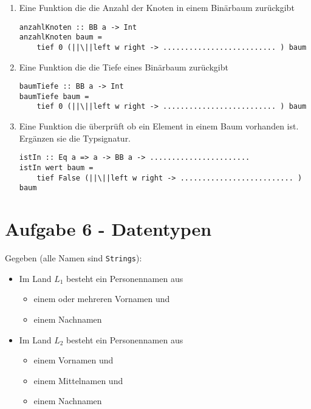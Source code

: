 \documentclass{article}
\begin{document}
\begin{enumerate} [label={\alph*)}]
    \item Eine Funktion die die Anzahl der Knoten in einem Binärbaum zurückgibt
\begin{verbatim}
anzahlKnoten :: BB a -> Int
anzahlKnoten baum =
    tief 0 (||\||left w right -> .......................... ) baum
\end{verbatim}

    \item Eine Funktion die die Tiefe eines Binärbaum zurückgibt
        \begin{verbatim}
baumTiefe :: BB a -> Int
baumTiefe baum =
    tief 0 (||\||left w right -> .......................... ) baum
        \end{verbatim}

    \item Eine Funktion die überprüft ob ein Element in einem Baum vorhanden ist. Ergänzen sie die Typsignatur.
\begin{verbatim}
istIn :: Eq a => a -> BB a -> .......................
istIn wert baum =
    tief False (||\||left w right -> .......................... ) baum
\end{verbatim}

\end{enumerate}

\section*{Aufgabe 6 - Datentypen}
Gegeben (alle Namen sind \texttt{Strings}):
\begin{itemize}
    \item Im Land \textit{$L_{1}$} besteht ein Personennamen aus
        \begin{itemize}
            \item einem oder mehreren Vornamen und
            \item einem Nachnamen
        \end{itemize}
    \item Im Land \textit{$L_{2}$} besteht ein Personennamen aus
        \begin{itemize}
            \item einem Vornamen und
            \item einem Mittelnamen und
            \item einem Nachnamen
        \end{itemize}
\end{itemize}
\end{document}

